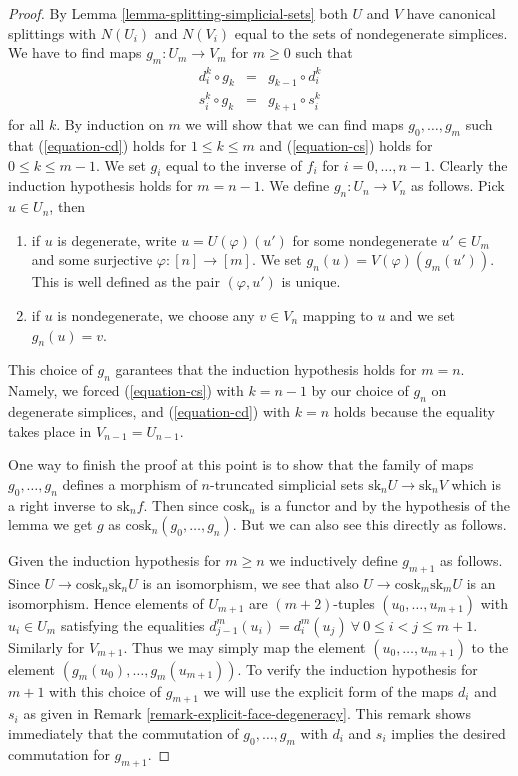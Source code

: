 \begin{proof}
By Lemma \ref{lemma-splitting-simplicial-sets}
both $U$ and $V$ have canonical splittings with $N(U_i)$
and $N(V_i)$ equal to the sets of nondegenerate simplices.
We have to find maps $g_m : U_m \to V_m$ for $m \geq 0$ such
that
\begin{eqnarray}
d^k_i \circ g_k & = & g_{k - 1} \circ d^k_i
\label{equation-cd}
\\
s^k_i \circ g_k & = & g_{k + 1} \circ s^k_i
\label{equation-cs}
\end{eqnarray}
for all $k$. By induction on $m$ we will show that we can find maps
$g_0, \ldots, g_m$ such that (\ref{equation-cd}) holds for
$1 \leq k \leq m$ and (\ref{equation-cs}) holds for $0 \leq k \leq m - 1$.
We set $g_i$ equal to the inverse of $f_i$ for $i = 0, \ldots, n - 1$.
Clearly the induction hypothesis holds for $m = n - 1$.
We define $g_n : U_n \to V_n$ as follows.
Pick $u \in U_n$, then
\begin{enumerate}
\item if $u$ is degenerate, write  $u = U(\varphi)(u')$
for some nondegenerate $u' \in U_m$ and some
surjective $\varphi : [n] \to [m]$. We set
$g_n(u) = V(\varphi)(g_m(u'))$. This is well defined
as the pair $(\varphi, u')$ is unique.
\item if $u$ is nondegenerate, we choose any $v \in V_n$
mapping to $u$ and we set $g_n(u) = v$.
\end{enumerate}
This choice of $g_n$ garantees that the induction hypothesis
holds for $m = n$. Namely, we forced (\ref{equation-cs}) with $k = n - 1$
by our choice of $g_n$ on degenerate simplices, and (\ref{equation-cd})
with $k = n$ holds because the equality takes place in
$V_{n - 1} = U_{n - 1}$.

\medskip\noindent
One way to finish the proof at this point is to show
that the family of maps $g_0, \ldots, g_n$ defines
a morphism of $n$-truncated simplicial sets
$\text{sk}_n U \to \text{sk}_n V$ which is
a right inverse to $\text{sk}_nf$. Then since
$\text{cosk}_n$ is a functor and by the hypothesis
of the lemma we get $g$ as $\text{cosk}_n(g_0, \ldots, g_n)$.
But we can also see this directly as follows.

\medskip\noindent
Given the induction hypothesis for $m \geq n$
we inductively define $g_{m + 1}$ as follows.
Since $U \to \text{cosk}_n \text{sk}_n U$
is an isomorphism, we see that also
$U \to \text{cosk}_m \text{sk}_m U$ is an
isomorphism. Hence elements of $U_{m + 1}$
are $(m + 2)$-tuples $(u_0, \ldots, u_{m + 1})$ with
$u_i \in U_m$ satisfying the equalities
$d^m_{j - 1}(u_i) = d^m_i(u_j)\ \forall\ 0\leq i < j\leq m + 1$.
Similarly for $V_{m + 1}$.
Thus we may simply map the element
$(u_0, \ldots, u_{m + 1})$ to the element
$(g_m(u_0), \ldots, g_m(u_{m + 1}))$.
To verify the induction hypothesis for $m + 1$ with
this choice of $g_{m + 1}$ we will use the
explicit form of the maps $d_i$ and $s_i$
as given in Remark \ref{remark-explicit-face-degeneracy}.
This remark shows immediately that the commutation of
$g_0, \ldots, g_m$ with $d_i$ and $s_i$ implies the
desired commutation for $g_{m + 1}$.
\end{proof}

